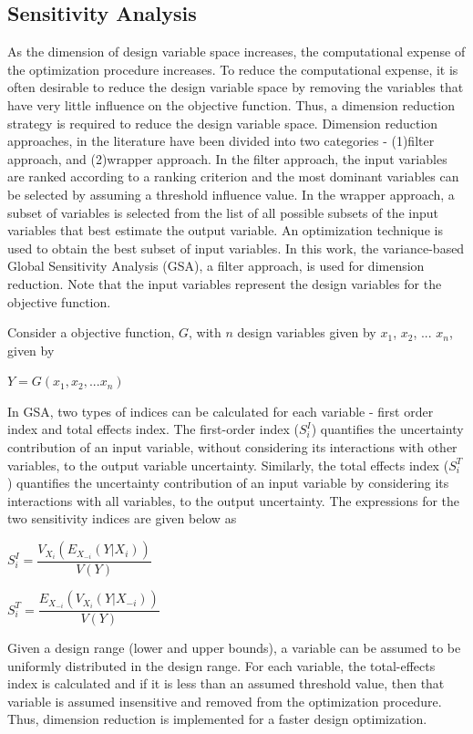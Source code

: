 \documentclass[11pt]{article}
\begin{document}
\subsection{Sensitivity Analysis}
\hspace{5 mm} As the dimension of design variable space increases, the computational expense of the optimization procedure increases. To reduce the computational expense, it is often desirable to reduce the design variable space by removing the variables that have very little influence on the objective function. Thus, a dimension reduction strategy is required to reduce the design variable space. Dimension reduction approaches, in the literature have been divided into two categories - (1)filter approach, and (2)wrapper approach. In the filter approach, the input variables are ranked according to a ranking criterion and the most dominant variables can be selected by assuming a threshold influence value. In the wrapper approach, a subset of variables is selected from the list of all possible subsets of the input variables that best estimate the output variable. An optimization technique is used to obtain the best subset of input variables. In this work, the variance-based Global Sensitivity Analysis (GSA), a filter approach, is used for dimension reduction. Note that the input variables represent the design variables for the objective function.

\hspace{5 mm} Consider a objective function, $G$, with $n$ design variables given by $x_{1}$, $x_{2}$, ...  $x_{n}$, given by

\centerline{$Y = G(x_{1}, x_{2}, ... x_{n})$}

In GSA, two types of indices can be calculated for each variable - first order index and total effects index. The first-order index ($S_{i}^{I}$) quantifies the uncertainty contribution of an input variable, without considering its interactions with other variables, to the output variable uncertainty. Similarly, the total effects index ($S_{i}^{T}$) quantifies the uncertainty contribution of an input variable by considering its interactions with all variables, to the output uncertainty. The expressions for the two sensitivity indices are given below as 

\centerline{$S_{i}^{I} = \dfrac{V_{X_i}(E_{X_{-i}}(Y|X_{i}))}{V(Y)}$}
\centerline{$S_{i}^{T} = \dfrac{E_{X_{-i}}(V_{X_{i}}(Y|X_{-i}))}{V(Y)}$}

Given a design range (lower and upper bounds), a variable can be assumed to be uniformly distributed in the design range. For each variable, the total-effects index is calculated and if it is less than an assumed threshold value, then that variable is assumed insensitive and removed from the optimization procedure. Thus, dimension reduction is implemented for a faster design optimization. \cite{Wahl}
\end{document}
